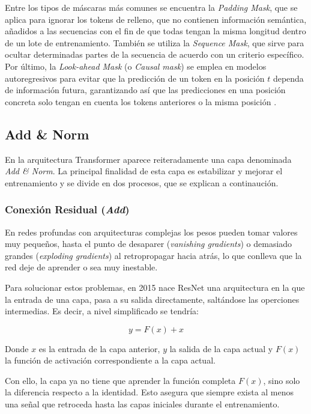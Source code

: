 \documentclass[11pt]{book}
\begin{document}
Entre los tipos de máscaras más comunes se encuentra la \textit{Padding Mask}, que se aplica para ignorar los tokens de relleno, que no contienen información semántica, añadidos a las secuencias con el fin de que todas tengan la misma longitud dentro de un lote de entrenamiento. También se utiliza la \textit{Sequence Mask}, que sirve para ocultar determinadas partes de la secuencia de acuerdo con un criterio específico. Por último, la \textit{Look-ahead Mask} (o \textit{Causal mask}) se emplea en modelos autoregresivos para evitar que la predicción de un token en la posición $t$ dependa de información futura, garantizando así que las predicciones en una posición concreta solo tengan en cuenta los tokens anteriores o la misma posición \parencite{swarms_masking_pytorch}.


\subsection{Add \& Norm \parencite{sharma2024addnorm}} \label{subsec:addnorm}

En la arquitectura Transformer aparece reiteradamente una capa denominada \textit{Add \& Norm}. La principal finalidad de esta capa es estabilizar y mejorar el entrenamiento y se divide en dos procesos, que se explican a continaución.
\subsubsection{Conexión Residual (\textit{Add})}
En redes profundas con arquitecturas complejas los pesos pueden tomar valores muy pequeños, hasta el punto de desaparer (\textit{vanishing gradients}) o demasiado grandes (\textit{exploding gradients}) al retropropagar hacia atrás, lo que conlleva que la red deje de aprender o sea muy inestable. 

Para solucionar estos problemas, en 2015 nace ResNet una arquitectura en la que la entrada de una capa, pasa a su salida directamente, saltándose las operciones intermedias. Es decir, a nivel simplificado se tendría: 

\[
y = F(x) + x
\]

Donde $x$ es la entrada de la capa anterior, $y$ la salida de la capa actual y $F(x)$ la función de activación correspondiente a la capa actual.

Con ello, la capa ya no tiene que aprender la función completa $F(x)$, sino solo la diferencia respecto a la identidad. Esto asegura que siempre exista al menos una señal que retroceda hasta las capas iniciales durante el entrenamiento.
\end{document}
